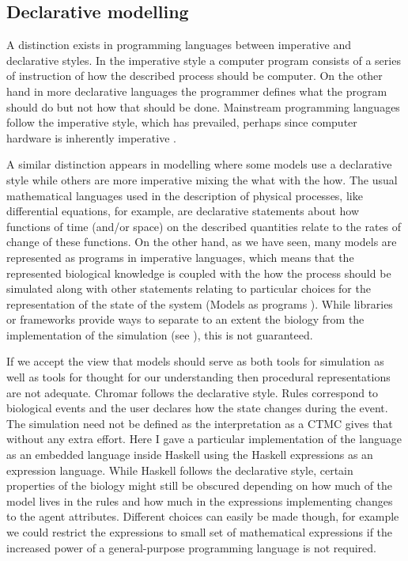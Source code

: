 \subsection{Declarative modelling}
A distinction exists in programming languages between imperative and declarative
styles. In the imperative style a computer program consists of a series of
instruction of how the described process should be computer. On the other hand
in more declarative languages the programmer defines what the program should do
but not how that should be done. Mainstream programming languages follow the
imperative style, which has prevailed, perhaps since computer hardware is
inherently imperative \citep{backus2007can}.

A similar distinction appears in modelling where some models use a declarative
style while others are more imperative mixing the what with the how. The usual
mathematical languages used in the description of physical processes, like
differential equations, for example, are declarative statements about how
functions of time (and/or space) on the described quantities relate to the rates
of change of these functions. On the other hand, as we have seen, many models
are represented as programs in imperative languages, which means that the
represented biological knowledge is coupled with the how the process should be
simulated along with other statements relating to particular choices for the
representation of the state of the system (Models as programs
). While libraries or frameworks provide ways to
separate to an extent the biology from the implementation of the simulation (see
), this is not guaranteed.

If we accept the view that models should serve as both tools for simulation as
well as tools for thought for our understanding then procedural representations
are not adequate. Chromar follows the declarative style. Rules correspond to
biological events and the user declares how the state changes during the
event. The simulation need not be defined as the interpretation as a CTMC gives
that without any extra effort. Here I gave a particular implementation of the
language as an embedded language inside Haskell using the Haskell expressions as
an expression language. While Haskell follows the declarative style, certain
properties of the biology might still be obscured depending on how much of the
model lives in the rules and how much in the expressions implementing changes to
the agent attributes. Different choices can easily be made though, for example
we could restrict the expressions to small set of mathematical expressions
\citep[perhaps a subset of MathML][]{ausbrooks2003mathematical} if the increased
power of a general-purpose programming language is not required.


